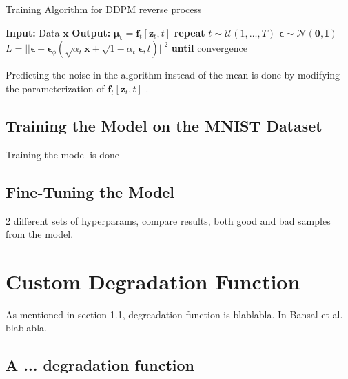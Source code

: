 \documentclass[12pt]{report} %
\begin{document}
\begin{definitionbox}{Training Algorithm for DDPM reverse process \cite{ho2020denoising}}
  \begin{algorithmic}
    \State \textbf{Input:} Data $\mathbf{x}$
    \State \textbf{Output:} $\mathbf{\mu_{t}} = \mathbf{f}_{t}[\mathbf{z}_{t},t]$
    \State \textbf{repeat}
       
        \State $t \sim \mathcal{U}(1, \dots, T)$ 
        \State $\mathbf{\epsilon} \sim \mathcal{N}(\mathbf{0}, \mathbf{I})$ 
        \State $L = ||\mathbf{\epsilon} - \mathbf{\epsilon}_{\phi}(\sqrt{\alpha_{t}}\mathbf{x} + \sqrt{1 - \alpha_{t}}\mathbf{\epsilon}, t)||^{2}$ 
      \EndFor {}
    \State \textbf{until} convergence
  \end{algorithmic}
\end{definitionbox}

Predicting the noise in the algorithm instead of the mean is done by modifying the parameterization of $\mathbf{f}_{t}[\mathbf{z}_{t}, t]$ \cite{ho2020denoising}.

\section{Training the Model on the MNIST Dataset}

Training the model is done

\section{Fine-Tuning the Model}

2 different sets of hyperparams, compare results, both good and bad samples from the model.





\chapter{Custom Degradation Function}

As mentioned in section 1.1, degreadation function is blablabla. In Bansal et al. blablabla.

\section{A ... degradation function}
\end{document}
